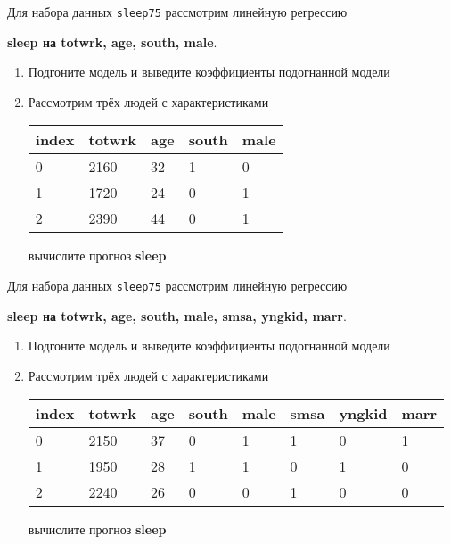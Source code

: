 \begin{exercise}
Для набора данных \texttt{sleep75} рассмотрим линейную регрессию 
\begin{center}
	\textbf{sleep на totwrk, age, south, male}.
\end{center}
\begin{enumerate}
	\item Подгоните модель и выведите коэффициенты подогнанной модели
	\item Рассмотрим трёх людей с характеристиками
	\begin{center}
		\begin{tabular}{|l||l|l|l|l|}\hline
			index & totwrk & age & south & male \\ \hline\hline
			0 & 2160 & 32 & 1 & 0 \\
			1 & 1720 & 24 & 0 & 1 \\
			2 & 2390 & 44 & 0 & 1 \\ \hline
		\end{tabular}
	\end{center}
	вычислите прогноз \textbf{sleep} 
\end{enumerate}
\end{exercise}

\begin{exercise}
Для набора данных \texttt{sleep75} рассмотрим линейную регрессию 
\begin{center}
	\textbf{sleep на totwrk, age, south, male, smsa, yngkid, marr}.
\end{center}
\begin{enumerate}
	\item Подгоните модель и выведите коэффициенты подогнанной модели
	\item Рассмотрим трёх людей с характеристиками
	\begin{center}
		\begin{tabular}{|l||l|l|l|l|l|l|l|}\hline
			index & totwrk & age & south & male & smsa & yngkid & marr \\ \hline\hline
			0 & 2150 & 37 & 0 & 1 & 1 & 0 & 1 \\
			1 & 1950 & 28 & 1 & 1 & 0 & 1 & 0 \\
			2 & 2240 & 26 & 0 & 0 & 1 & 0 & 0 \\ \hline
		\end{tabular}
	\end{center}
	вычислите прогноз \textbf{sleep} 
\end{enumerate}
\end{exercise}

